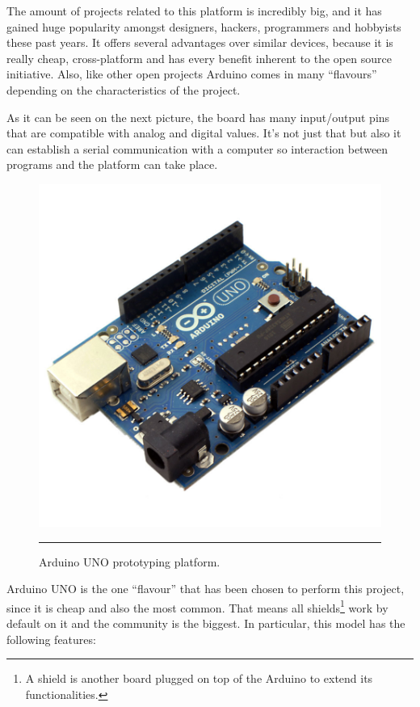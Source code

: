 The amount of projects related to this platform is incredibly big, and it has gained huge popularity amongst designers, hackers, programmers and hobbyists these past years. It offers several advantages over similar devices, because it is really cheap, cross-platform and has every benefit inherent to the open source initiative. Also, like other open projects Arduino comes in many ``flavours'' depending on the characteristics of the project.

As it can be seen on the next picture, the board has many input/output pins that are compatible with analog and digital values. It's not just that but also it can establish a serial communication with a computer so interaction between programs and the platform can take place.


\begin{figure}[htbp]
    \centering
    \includegraphics[scale=0.2]{./Figures/auno.jpg}
        \rule{35em}{0.5pt}
        \caption[Arduino UNO]{Arduino UNO prototyping platform.}
    \label{fig:ArduinoUNO}
\end{figure}

Arduino UNO is the one ``flavour'' that has been chosen to perform this project, since it is cheap and also the most common. That means all shields\footnote{A shield is another board plugged on top of the Arduino to extend its functionalities.}  work by default on it and the community is the biggest. In particular, this model has the following features\citep{arduinounor3}:
\\

